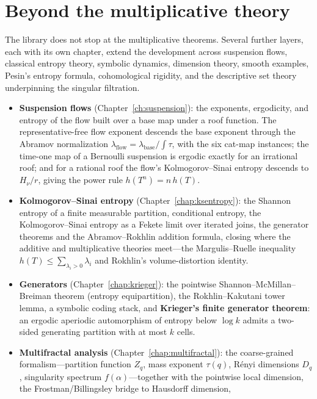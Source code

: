 \section{Beyond the multiplicative theory}

The library does not stop at the multiplicative theorems. Several further layers, each with
its own chapter, extend the development across suspension flows, classical entropy theory,
symbolic dynamics, dimension theory, smooth examples, Pesin's entropy formula, cohomological
rigidity, and the descriptive set theory underpinning the singular filtration.

\begin{itemize}
  \item \textbf{Suspension flows} (Chapter~\ref{ch:suspension}): the exponents, ergodicity,
    and entropy of the flow built over a base map under a roof function. The
    representative-free flow exponent descends the base exponent through the Abramov
    normalization \(\lambda_{\mathrm{flow}}=\lambda_{\mathrm{base}}/\!\int\tau\), with the
    six cat-map instances; the time-one map of a Bernoulli suspension is ergodic exactly for
    an irrational roof; and for a rational roof the flow's Kolmogorov--Sinai entropy descends
    to \(H_\nu/r\), giving the power rule \(h(T^{n})=n\,h(T)\).
  \item \textbf{Kolmogorov--Sinai entropy} (Chapter~\ref{chap:ksentropy}): the Shannon
    entropy of a finite measurable partition, conditional entropy, the Kolmogorov--Sinai
    entropy as a Fekete limit over iterated joins, the generator theorems and the
    Abramov--Rokhlin addition formula, closing where the additive and multiplicative
    theories meet---the Margulis--Ruelle inequality
    \(h(T)\le\sum_{\lambda_i>0}\lambda_i\) and Rokhlin's volume-distortion identity.
  \item \textbf{Generators} (Chapter~\ref{chap:krieger}): the pointwise
    Shannon--McMillan--Breiman theorem (entropy equipartition), the Rokhlin--Kakutani
    tower lemma, a symbolic coding stack, and \textbf{Krieger's finite generator
    theorem}: an ergodic aperiodic automorphism of entropy below \(\log k\) admits a
    two-sided generating partition with at most \(k\) cells.
  \item \textbf{Multifractal analysis} (Chapter~\ref{chap:multifractal}): the
    coarse-grained formalism---partition function \(Z_q\), mass exponent \(\tau(q)\),
    R\'enyi dimensions \(D_q\), singularity spectrum \(f(\alpha)\)---together with the
    pointwise local dimension, the Frostman/Billingsley bridge to Hausdorff dimension,

\end{itemize}

